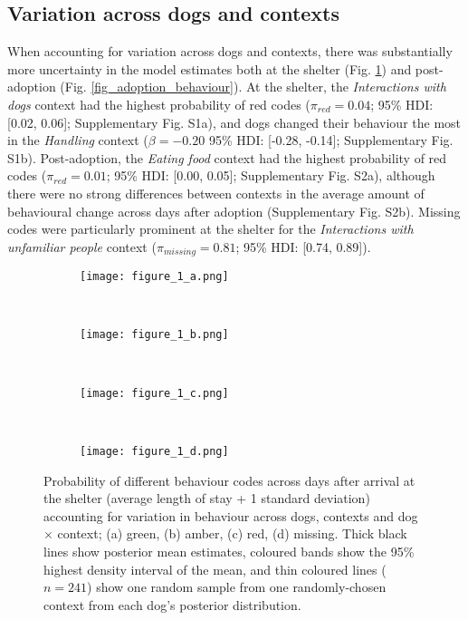 \documentclass[12pt]{article}
\begin{document}
\subsection{Variation across  dogs and contexts}
When accounting for variation across dogs and contexts, there was substantially more uncertainty in the model estimates both at the shelter (Fig. \ref{fig_shelter_behaviour}) and post-adoption (Fig. \ref{fig_adoption_behaviour}). At the shelter, the \textit{Interactions with dogs} context had the highest probability of red codes ($\pi_{red} = 0.04$; 95\% HDI: [0.02, 0.06]; Supplementary Fig. S1a), and dogs changed their behaviour the most in the \textit{Handling} context ($\beta = -0.20$ 95\% HDI: [-0.28, -0.14]; Supplementary Fig. S1b). Post-adoption, the \textit{Eating food}
context had the highest probability of red codes ($\pi_{red} = 0.01$; 95\% HDI: [0.00, 0.05]; Supplementary Fig. S2a), although there were no strong differences between contexts in the average amount of behavioural change across days after adoption (Supplementary Fig. S2b). Missing codes were particularly prominent at the shelter for the \textit{Interactions with unfamiliar people} context ($\pi_{missing} = 0.81$; 95\% HDI: [0.74, 0.89]).


\begin{figure}[t!]
  \hspace{-2cm}%
  \begin{subfigure}{0.4\textwidth}
    \centering
    \texttt{[image: figure\_1\_a.png]}
  \end{subfigure}%
  ~%
  \hspace{-2cm}
  \begin{subfigure}{0.4\textwidth}
    \centering
    \texttt{[image: figure\_1\_b.png]}
  \end{subfigure}%
  ~%
  \hspace{-2cm}
  \begin{subfigure}{0.4\textwidth}
    \centering
    \texttt{[image: figure\_1\_c.png]}
  \end{subfigure}%
  ~%
  \hspace{-2cm}
  \begin{subfigure}{0.4\textwidth}
    \centering
    \texttt{[image: figure\_1\_d.png]}
  \end{subfigure}%

  \caption{Probability of different behaviour codes across days after arrival at the shelter (average length of stay + 1 standard deviation) accounting for variation in behaviour across dogs, contexts and dog $\times$ context; (a) green, (b) amber, (c) red, (d) missing. Thick black lines show posterior mean estimates, coloured bands show the 95\% highest density interval of the mean, and thin coloured lines ($n = 241$) show one random sample from one randomly-chosen context from each dog's posterior distribution.}
  \label{fig_shelter_behaviour}
\end{figure}
\end{document}
